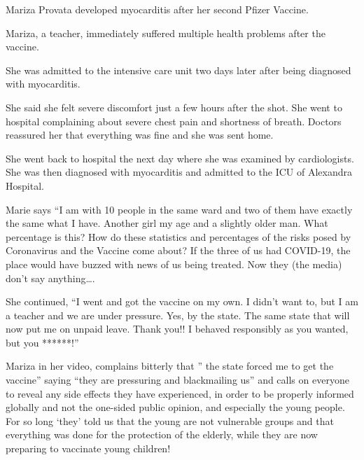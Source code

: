 Mariza Provata developed myocarditis after her second Pfizer Vaccine.

Mariza, a teacher, immediately suffered multiple health problems after the
vaccine.

She was admitted to the intensive care unit two days later after being diagnosed
with myocarditis.

She said she felt severe discomfort just a few hours after the shot. She went to
hospital complaining about severe chest pain and shortness of breath. Doctors
reassured her that everything was fine and she was sent home.

She went back to hospital the next day where she was examined by
cardiologists. She was then diagnosed with myocarditis and admitted to the ICU
of Alexandra Hospital.

Marie says “I am with 10 people in the same ward and two of them have exactly
the same what I have. Another girl my age and a slightly older man. What
percentage is this? How do these statistics and percentages of the risks posed
by Coronavirus and the Vaccine come about? If the three of us had COVID-19, the
place would have buzzed with news of us being treated. Now they (the media)
don’t say anything….

She continued, “I went and got the vaccine on my own. I didn’t want to, but I am
a teacher and we are under pressure. Yes, by the state. The same state that will
now put me on unpaid leave. Thank you!! I behaved responsibly as you wanted, but
you ******!”

Mariza in her video, complains bitterly that ” the state forced me to get the
vaccine” saying “they are pressuring and blackmailing us” and calls on everyone
to reveal any side effects they have experienced, in order to be properly
informed globally and not the one-sided public opinion, and especially the young
people. For so long ‘they’ told us that the young are not vulnerable groups and
that everything was done for the protection of the elderly, while they are now
preparing to vaccinate young children!

